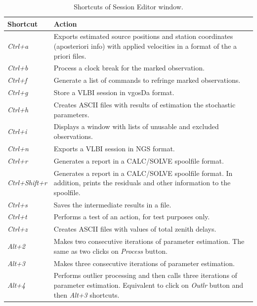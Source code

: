 \documentclass [10pt,letterpaper]{report}
\begin{document}
\begin{table}[h]
\centering
\begin{tabular}{l p{}}
\hline
Shortcut          & Action \\
\hline
{\sl Ctrl+a}      & Exports estimated source positions and station coordinates
                    (aposteriori info) with applied velocities in a format of
                    the a priori files.\\
{\sl Ctrl+b}      & Process a clock break for the marked observation.\\
{\sl Ctrl+f}      & Generate a list of commands to refringe marked observations.\\
{\sl Ctrl+g}      & Store a VLBI session in vgosDa format.\\
{\sl Ctrl+h}      & Creates ASCII files with results of estimation the stochastic
                    parameters.\\
{\sl Ctrl+i}      & Displays a window with lists of unusable and excluded
                    observations.\\
{\sl Ctrl+n}      & Exports a VLBI session in NGS format.\\
{\sl Ctrl+r}      & Generates a report in a CALC/SOLVE spoolfile format.\\
{\sl Ctrl+Shift+r}& Generates a report in a CALC/SOLVE spoolfile format.
                    In addition, prints the residuals and other information
                    to the spoolfile.\\
{\sl Ctrl+s}      & Saves the intermediate results in a file.\\
{\sl Ctrl+t}      & Performs a test of an action, for test purposes only.\\
{\sl Ctrl+z}      & Creates ASCII files with values of total zenith delays.\\
{\sl Alt+2}       & Makes two consecutive iterations of parameter estimation.
                    The same as two clicks on {\sl Process} button.\\
{\sl Alt+3}       & Makes three consecutive iterations of parameter estimation.\\
{\sl Alt+4}       & Performs outlier processing and then calls three iterations
                    of parameter estimation. Equivalent to click on {\sl Outlr}
                    button and then {\sl Alt+3} shortcuts.\\
\hline
\end{tabular}
\caption{Shortcuts of Session Editor window.}
\label{tab-shortkeys}
\end{table}
\end{document}
